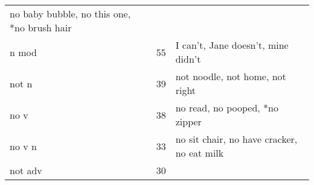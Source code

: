 \documentclass[man]{apa6}
\begin{document}
\begin{longtable}[]{@{}lll@{}}
\begin{minipage}[t]{0.47\columnwidth}
no baby bubble, no this one, *no brush hair\strut
\end{minipage}\tabularnewline
\begin{minipage}[t]{0.23\columnwidth}\raggedright\strut
n mod\strut
\end{minipage} & \begin{minipage}[t]{0.15\columnwidth}\raggedright\strut
55\strut
\end{minipage} & \begin{minipage}[t]{0.47\columnwidth}\raggedright\strut
I can't, Jane doesn't, mine didn't\strut
\end{minipage}\tabularnewline
\begin{minipage}[t]{0.23\columnwidth}\raggedright\strut
not n\strut
\end{minipage} & \begin{minipage}[t]{0.15\columnwidth}\raggedright\strut
39\strut
\end{minipage} & \begin{minipage}[t]{0.47\columnwidth}\raggedright\strut
not noodle, not home, not right\strut
\end{minipage}\tabularnewline
\begin{minipage}[t]{0.23\columnwidth}\raggedright\strut
no v\strut
\end{minipage} & \begin{minipage}[t]{0.15\columnwidth}\raggedright\strut
38\strut
\end{minipage} & \begin{minipage}[t]{0.47\columnwidth}\raggedright\strut
no read, no pooped, *no zipper\strut
\end{minipage}\tabularnewline
\begin{minipage}[t]{0.23\columnwidth}\raggedright\strut
no v n\strut
\end{minipage} & \begin{minipage}[t]{0.15\columnwidth}\raggedright\strut
33\strut
\end{minipage} & \begin{minipage}[t]{0.47\columnwidth}\raggedright\strut
no sit chair, no have cracker, no eat milk\strut
\end{minipage}\tabularnewline
\begin{minipage}[t]{0.23\columnwidth}\raggedright\strut
not adv\strut
\end{minipage} & \begin{minipage}[t]{0.15\columnwidth}\raggedright\strut
30\strut
\end{minipage} & \begin{minipage}[t]{0.47\columnwidth}\raggedright\strut

\end{minipage}
\end{longtable}
\end{document}
